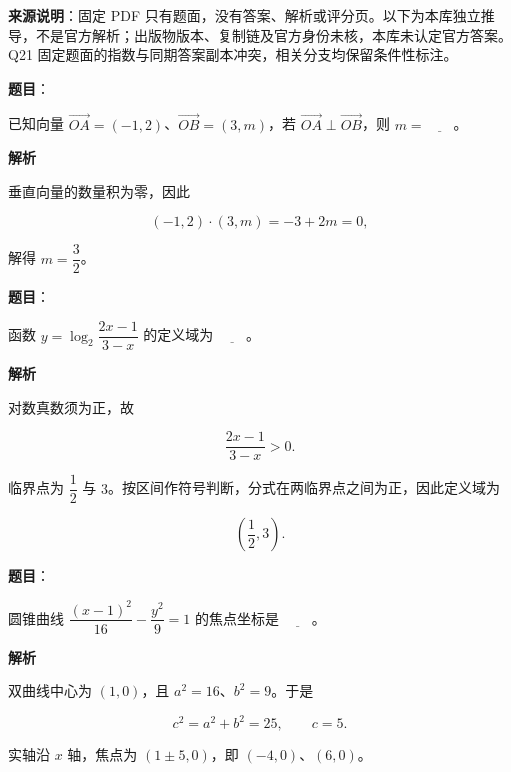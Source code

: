 

\begin{gktip}
\textbf{来源说明}：固定 PDF 只有题面，没有答案、解析或评分页。以下为本库独立推导，不是官方解析；出版物版本、复制链及官方身份未核，本库未认定官方答案。Q21 固定题面的指数与同期答案副本冲突，相关分支均保留条件性标注。
\end{gktip}


\begin{answer}

\textbf{题目}：

已知向量 $\overrightarrow{OA}=(-1,2)$、$\overrightarrow{OB}=(3,m)$，若 $\overrightarrow{OA}\perp\overrightarrow{OB}$，则 $m=\underline{\qquad}$。

\textbf{解析}

垂直向量的数量积为零，因此

\nopagebreak[4]
\[
(-1,2)\cdot(3,m)=-3+2m=0,
\]

解得 $m=\dfrac32$。


\end{answer}
\begin{answer}

\textbf{题目}：

函数 $y=\log_{2}\dfrac{2x-1}{3-x}$ 的定义域为 $\underline{\qquad}$。

\textbf{解析}

对数真数须为正，故

\nopagebreak[4]
\[
\frac{2x-1}{3-x}>0.
\]

临界点为 $\dfrac12$ 与 $3$。按区间作符号判断，分式在两临界点之间为正，因此定义域为

\nopagebreak[4]
\[
\left(\frac12,3\right).
\]


\end{answer}
\begin{answer}

\textbf{题目}：

圆锥曲线 $\dfrac{(x-1)^2}{16}-\dfrac{y^2}{9}=1$ 的焦点坐标是 $\underline{\qquad}$。

\textbf{解析}

双曲线中心为 $(1,0)$，且 $a^2=16$、$b^2=9$。于是

\nopagebreak[4]
\[
c^2=a^2+b^2=25,\qquad c=5.
\]

实轴沿 $x$ 轴，焦点为 $(1\pm5,0)$，即 $(-4,0)$、$(6,0)$。


\end{answer}
